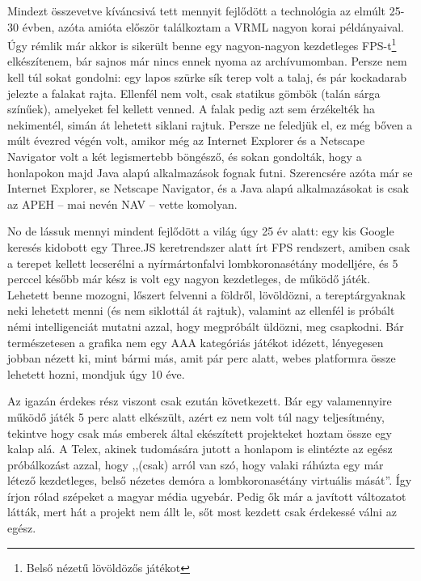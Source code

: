 \documentclass[a5paper,10pt]{article}
\begin{document}
\bigskip

Mindezt összevetve kíváncsivá tett mennyit fejlődött a technológia az elmúlt 25-30 évben, azóta amióta először találkoztam a VRML nagyon korai példányaival. Úgy rémlik már akkor is sikerült benne egy nagyon-nagyon kezdetleges FPS-t\footnote{Belső nézetű lövöldözős játékot} elkészítenem, bár sajnos már nincs ennek nyoma az archívumomban. Persze nem kell túl sokat gondolni: egy lapos szürke sík terep volt a talaj, és pár kockadarab jelezte a falakat rajta. Ellenfél nem volt, csak statikus gömbök (talán sárga színűek), amelyeket fel kellett venned. A falak pedig azt sem érzékelték ha nekimentél, simán át lehetett siklani rajtuk. Persze ne feledjük el, ez még bőven a múlt évezred végén volt, amikor még az Internet Explorer és a Netscape Navigator volt a két legismertebb böngésző, és sokan gondolták, hogy a honlapokon majd Java alapú alkalmazások fognak futni. Szerencsére azóta már se Internet Explorer, se Netscape Navigator, és a Java alapú alkalmazásokat is csak az APEH -- mai nevén NAV -- vette komolyan.

\bigskip

No de lássuk mennyi mindent fejlődött a világ úgy 25 év alatt: egy kis Google keresés kidobott egy Three.JS keretrendszer alatt írt FPS rendszert\cite{fpsdemo}, amiben csak a terepet kellett lecserélni a nyírmártonfalvi lombkoronasétány modelljére, és 5 perccel később már kész is volt egy nagyon kezdetleges, de működő játék. Lehetett benne mozogni, lőszert felvenni a földről, lövöldözni, a tereptárgyaknak neki lehetett menni (és nem siklottál át rajtuk), valamint az ellenfél is próbált némi intelligenciát mutatni azzal, hogy megpróbált üldözni, meg csapkodni. Bár természetesen a grafika nem egy AAA kategóriás játékot idézett, lényegesen jobban nézett ki, mint bármi más, amit pár perc alatt, webes platformra össze lehetett hozni, mondjuk úgy 10 éve.

\bigskip

Az igazán érdekes rész viszont csak ezután következett. Bár egy valamennyire működő játék 5 perc alatt elkészült, azért ez nem volt túl nagy teljesítmény, tekintve hogy csak más emberek által ekészített projekteket hoztam össze egy kalap alá. A Telex, akinek tudomására jutott a honlapom is elintézte az egész próbálkozást azzal, hogy ,,(csak) arról van szó, hogy valaki ráhúzta egy már létező kezdetleges, belső nézetes demóra a lombkoronasétány virtuális mását''\cite{telex}. Így írjon rólad szépeket a magyar média ugyebár. Pedig ők már a javított változatot látták, mert hát a projekt nem állt le, sőt most kezdett csak érdekessé válni az egész.
\end{document}
